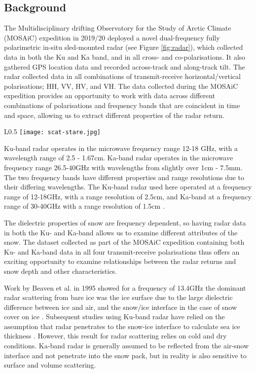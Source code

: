 \documentclass[11pt, a4paper]{article}
\begin{document}
\subsection{Background}

The Multidisciplinary drifting Observatory for the Study of Arctic Climate (MOSAiC) expedition in 2019/20 deployed a novel dual-frequency fully polarimetric in-situ sled-mounted radar (see Figure \ref{fig:radar}), which collected data in both the Ku and Ka band, and in all cross- and co-polarisations.  It also gathered GPS location data and recorded across-track and along-track tilt. The radar collected data in all combinations of transmit-receive horizontal/vertical polarisations; HH, VV, HV, and VH.  The data collected during the MOSAiC expedition provides an opportunity to work with data across different combinations of polarisations and frequency bands that are coincident in time and space, allowing us to extract different properties of the radar return.

\begin{wrapfigure}{L}{0.5\textwidth}
   		 \texttt{[image: scat-stare.jpg]}
    		\caption{The KuKa radar deployed during the MOSAiC expedition \cite{stroeve}.}
	\label{fig:radar}
\end{wrapfigure}


Ku-band radar operates in the microwave frequency range 12-18 GHz, with a wavelength range of 2.5 - 1.67cm. Ka-band radar operates in the microwave frequency range 26.5-40GHz with wavelengths from slightly over 1cm - 7.5mm. The two frequency bands have different properties and range resolutions due to their differing wavelengths.  The Ku-band radar used here operated at a frequency range of 12-18GHz, with a range resolution of 2.5cm, and Ka-band at a frequency range of 30-40GHz with a range resolution of 1.5cm \cite{stroeve}.

The dielectric properties of snow are frequency dependent, so having radar data in both the Ku- and Ka-band allows us to examine different attributes of the snow.  The dataset collected as part of the MOSAiC expedition containing both Ku- and Ka-band data in all four transmit-receive polarisations thus offers an exciting opportunity to examine relationships between the radar returns and snow depth and other characteristics.

Work by Beaven et al. in 1995 showed for a frequency of 13.4GHz the dominant radar scattering from bare ice was the ice surface due to the large dielectric difference between ice and air, and the snow/ice interface in the case of snow cover on ice \cite{beaven}.  Subsequent studies using Ku-band radar have relied on the assumption that radar penetrates to the snow-ice interface to calculate sea ice thickness \cite{laxonvol}.  However, this result for radar scattering relies on cold and dry conditions.  Ka-band radar is generally assumed to be reflected from the air-snow interface and not penetrate into the snow pack,  but in reality is also sensitive to surface and volume scattering.
\end{document}
